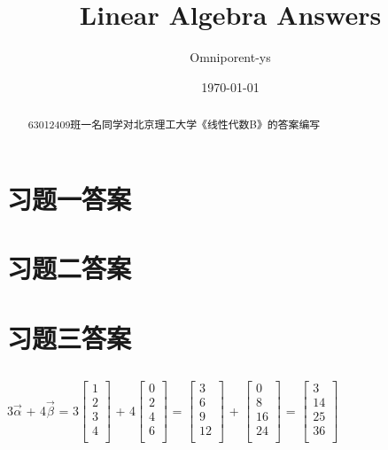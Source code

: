 \documentclass{ctexart}
\title{Linear Algebra Answers}
\author{Omniporent-ys}
\date{\today}
\begin{document}
    \maketitle

    \begin{abstract}
        63012409班一名同学对北京理工大学《线性代数B》的答案编写
    \end{abstract}
    \section{习题一答案}
    \section{习题二答案}
    \section{习题三答案}
        \subsection{}
            \begin{mdframed}
            3$\vec{\alpha}$ + 4$\vec{\beta}$
            = 3$\begin{bmatrix}
                1 \\
                2 \\
                3 \\
                4\\           
               \end{bmatrix}$
               + 4$\begin{bmatrix}
                0 \\
                2 \\
                4 \\
                6 \\           
               \end{bmatrix}$
             = $\begin{bmatrix}
                3 \\
                6 \\
                9 \\
                12 \\           
               \end{bmatrix}$
               +
               $\begin{bmatrix}
                0 \\
                8 \\
                16 \\
                24 \\           
               \end{bmatrix}$
                = 
                $\begin{bmatrix}
                3 \\
                14 \\
                25 \\
                36 \\           
               \end{bmatrix}$
            \end{mdframed}
        
\end{document}
